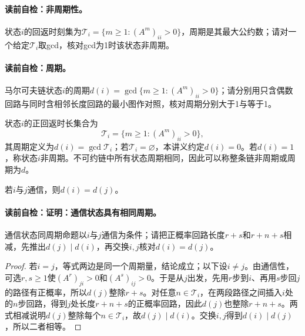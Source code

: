 \paragraph{读前自检：非周期性。}状态$i$的回返时刻集为$\mathcal T_i=\{m\ge1:(A^m)_{ii}>0\}$，周期是其最大公约数；请对一个给定$\mathcal T_i$取gcd，核对gcd为1时该状态非周期。\par

\paragraph{读前自检：周期。}马尔可夫链状态$i$的周期$d(i)=\gcd\{m\ge1:(A^m)_{ii}>0\}$；请分别用只含偶数回路与同时含相邻长度回路的最小图作对照，核对周期分别大于1与等于1。\par

\begin{definition}[周期]
状态$i$的正回返时长集合为
\[
\mathcal T_i=\{m\ge1:(A^m)_{ii}>0\},
\]
其周期定义为$d(i)=\gcd\mathcal T_i$；若$\mathcal T_i=\varnothing$，本讲义约定$d(i)=0$。若$d(i)=1$，称状态$i$非周期。不可约链中所有状态周期相同，因此可以称整条链非周期或周期为$d$。
\end{definition}

\label{struct:V5-C01-CH13}
\begin{proposition}[通信状态具有相同周期]\label{prop:V5-C01-common-period}
若$i$与$j$通信，则$d(i)=d(j)$。
\end{proposition}
\paragraph{读前自检：证明：通信状态具有相同周期。}通信状态同周期命题以$i$与$j$通信为条件；请把正概率回路长度$r+s$和$r+n+s$相减，先推出$d(j)\mid d(i)$，再交换$i,j$核对$d(i)=d(j)$。\par

\begin{proof}
若$i=j$，等式两边是同一个周期量，结论成立；以下设$i\ne j$。由通信性，可选$r,s\ge1$使$(A^r)_{ji}>0$和$(A^s)_{ij}>0$。于是从$j$出发，先用$r$步到$i$、再用$s$步回$j$的路径有正概率，所以$d(j)$整除$r+s$。对任意$n\in\mathcal T_i$，在两段路径之间插入$i$处的$n$步回路，得到$j$处长度$r+n+s$的正概率回路，因此$d(j)$也整除$r+n+s$。两式相减说明$d(j)$整除每个$n\in\mathcal T_i$，故$d(j)\mid d(i)$。交换$i,j$得到$d(i)\mid d(j)$，所以二者相等。
\end{proof}

